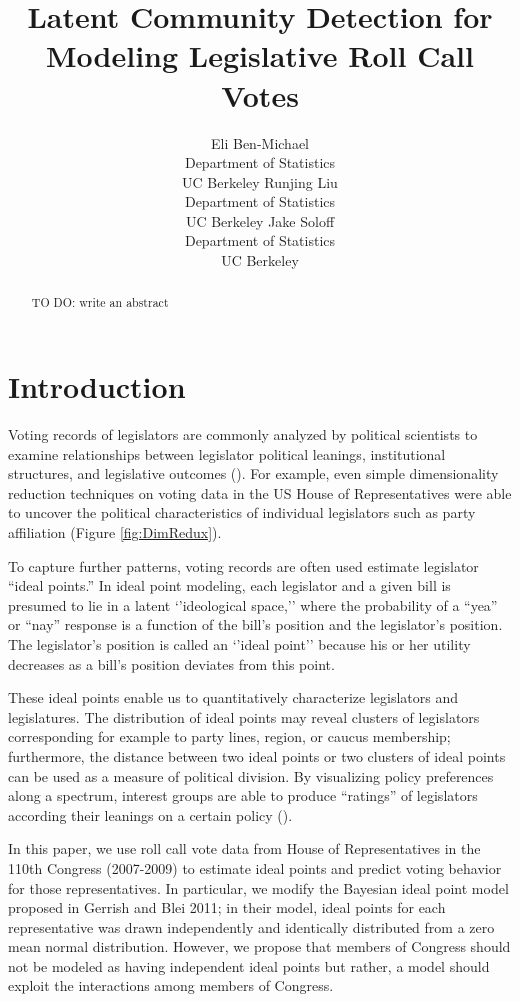 \documentclass{article}
\title{Latent Community Detection for Modeling Legislative Roll Call Votes}
\author{
  Eli Ben-Michael \\
  Department of Statistics\\
  UC Berkeley
   \And
  Runjing Liu \\
  Department of Statistics\\
  UC Berkeley
   \And
  Jake Soloff \\
  Department of Statistics\\
  UC Berkeley
}
\begin{document}

\maketitle

\vspace{-1em}

\begin{abstract}
{\color{red} TO DO: write an abstract}
\end{abstract}

\section{Introduction}
\label{introduction}
Voting records of legislators are commonly analyzed by political scientists to examine relationships between legislator political leanings, institutional structures, and legislative outcomes (\cite{Clinton2004}). For example, even simple dimensionality reduction techniques on voting data in the US House of Representatives were able to uncover the political characteristics of individual legislators such as party affiliation (Figure \ref{fig:DimRedux}). \par

To capture further patterns, voting records are often used estimate legislator ``ideal points.'' In ideal point modeling, each legislator and a given bill is presumed to lie in a latent `'ideological space,'' where the probability of a ``yea'' or ``nay'' response is a function of the bill's position and the legislator's position. The legislator's position is called an `'ideal point'' because his or her utility decreases as a bill's position deviates from this point. \par

These ideal points enable us to quantitatively characterize legislators and legislatures. The distribution of ideal points may reveal clusters of legislators corresponding for example to party lines, region, or caucus membership; furthermore, the distance between two ideal points or two clusters of ideal points can be used as  a measure of political division. By visualizing policy preferences along a spectrum, interest groups are able to produce ``ratings'' of legislators according their leanings on a certain policy (\cite{Clinton2004}). \par

In this paper, we use roll call vote data from House of Representatives in the 110th Congress (2007-2009) to estimate ideal points and predict voting behavior for those representatives. In particular, we modify the Bayesian ideal point model proposed in Gerrish and Blei 2011; in their model, ideal points for each representative was drawn independently and identically distributed from a zero mean normal distribution. However, we propose that members of Congress should not be modeled as having independent ideal points but rather, a model should exploit the interactions among members of Congress. \par
\end{document}
